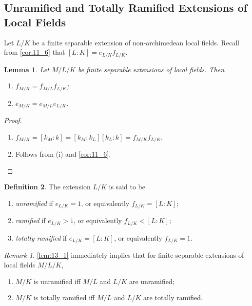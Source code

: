 \documentclass[11pt]{article}
\theoremstyle{definition}
\newtheorem{definition}{Definition}[subsection]
\theoremstyle{plain}
\newtheorem{lemma}[definition]{Lemma}
\theoremstyle{remark}
\newtheorem*{remark}{Remark}
\begin{document}
\subsection{Unramified and Totally Ramified Extensions of Local Fields}

Let $L/K$ be a finite separable extension of non-archimedean local fields.
Recall from \autoref{cor:11_6} that $[L : K] = e_{L/K} f_{L/K}$.

\begin{lemma}\label{lem:13_1}
    Let $M/L/K$ be finite separable extensions of local fields. Then
    \begin{enumerate}
        \item $f_{M/K} = f_{M/L} f_{L/K}$;
        \item $e_{M/K} = e_{M/L} e_{L/K}$.
    \end{enumerate}
\end{lemma}
\begin{proof}\phantom{}
    \begin{enumerate}
        \item $f_{M/K} = [k_M : k] = [k_M : k_L] [k_L : k] = f_{M/K} f_{L/K}$.
        \item Follows from (i) and \autoref{cor:11_6}. \qedhere
    \end{enumerate}
\end{proof}

\begin{definition}\label{def:13_2}
    The extension $L/K$ is said to be
    \begin{enumerate}
        \item \emph{unramified} if $e_{L/K} = 1$, or equivalently $f_{L/K} = [L : K]$;
        \item \emph{ramified} if $e_{L/K} > 1$, or equivalently $f_{L/K} < [L : K]$;
        \item \emph{totally ramified} if $e_{L/K} = [L : K]$, or equivalently $f_{L/K} = 1$.
    \end{enumerate}
\end{definition}

\begin{remark}
    \autoref{lem:13_1} immediately implies that for finite separable extensions of local fields $M/L/K$,
    \begin{enumerate}
        \item $M/K$ is unramified iff $M/L$ and $L/K$ are unramified;
        \item $M/K$ is totally ramified iff $M/L$ and $L/K$ are totally ramified.
    \end{enumerate}
\end{remark}
\end{document}
